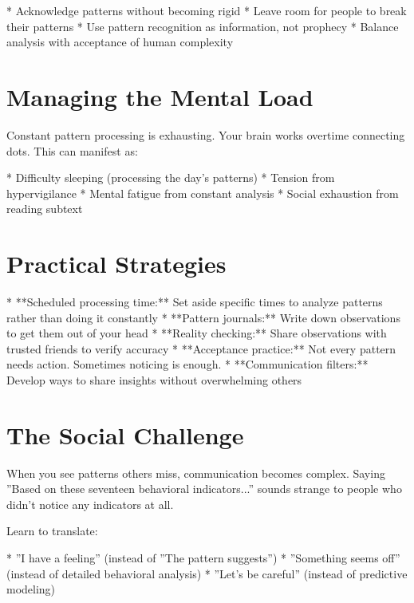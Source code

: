\documentclass[12pt,oneside]{book}
\begin{document}
                    * Acknowledge patterns without becoming rigid
                    * Leave room for people to break their patterns
                    * Use pattern recognition as information, not prophecy
                    * Balance analysis with acceptance of human complexity

\section{Managing the Mental Load}

Constant pattern processing is exhausting. Your brain works overtime connecting dots. This can manifest as:

                    * Difficulty sleeping (processing the day's patterns)
                    * Tension from hypervigilance
                    * Mental fatigue from constant analysis
                    * Social exhaustion from reading subtext

\section{Practical Strategies}

                    * **Scheduled processing time:** Set aside specific times to analyze patterns rather than doing it constantly
                    * **Pattern journals:** Write down observations to get them out of your head
                    * **Reality checking:** Share observations with trusted friends to verify accuracy
                    * **Acceptance practice:** Not every pattern needs action. Sometimes noticing is enough.
                    * **Communication filters:** Develop ways to share insights without overwhelming others

\section{The Social Challenge}

When you see patterns others miss, communication becomes complex. Saying ''Based on these seventeen behavioral indicators...'' sounds strange to people who didn't notice any indicators at all.

Learn to translate:

                    * ''I have a feeling'' (instead of ''The pattern suggests'')
                    * ''Something seems off'' (instead of detailed behavioral analysis)
                    * ''Let's be careful'' (instead of predictive modeling)
\end{document}

